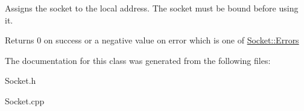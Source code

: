 Assigns the socket to the local address. The socket must be bound before using it. 

\begin{DoxyReturn}{Returns}
0 on success or a negative value on error which is one of \hyperlink{class_socket_a9f68308228badcdd299cd83e62e36976}{Socket\-::\-Errors} 
\end{DoxyReturn}


The documentation for this class was generated from the following files\-:\begin{DoxyCompactItemize}
\item 
Socket.\-h\item 
Socket.\-cpp\end{DoxyCompactItemize}
